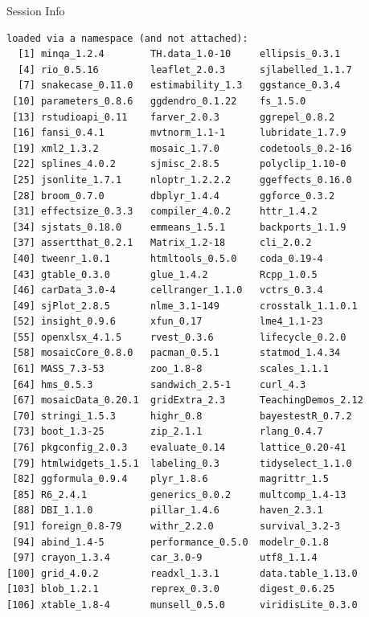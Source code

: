 \documentclass[10pt,handout]{beamer}\usepackage[]{graphicx}\usepackage[]{color}
\makeatletter
\newenvironment{kframe}{%
 \def\at@end@of@kframe{}%
 \ifinner\ifhmode%
  \def\at@end@of@kframe{\end{minipage}}%
  \begin{minipage}{\columnwidth}%
 \fi\fi%
 \def\FrameCommand##1{\hskip\@totalleftmargin \hskip-\fboxsep
 \colorbox{shadecolor}{##1}\hskip-\fboxsep
     \hskip-\linewidth \hskip-\@totalleftmargin \hskip\columnwidth}%
 \MakeFramed {\advance\hsize-\width
   \@totalleftmargin\z@ \linewidth\hsize
   \@setminipage}}%
 {\par\unskip\endMakeFramed%
 \at@end@of@kframe}
\newenvironment{knitrout}{}{} %
\makeatother
\begin{document}
\begin{frame}[fragile]{Session Info}
\begin{knitrout}
\begin{kframe}
\begin{verbatim}
loaded via a namespace (and not attached):
  [1] minqa_1.2.4        TH.data_1.0-10     ellipsis_0.3.1    
  [4] rio_0.5.16         leaflet_2.0.3      sjlabelled_1.1.7  
  [7] snakecase_0.11.0   estimability_1.3   ggstance_0.3.4    
 [10] parameters_0.8.6   ggdendro_0.1.22    fs_1.5.0          
 [13] rstudioapi_0.11    farver_2.0.3       ggrepel_0.8.2     
 [16] fansi_0.4.1        mvtnorm_1.1-1      lubridate_1.7.9   
 [19] xml2_1.3.2         mosaic_1.7.0       codetools_0.2-16  
 [22] splines_4.0.2      sjmisc_2.8.5       polyclip_1.10-0   
 [25] jsonlite_1.7.1     nloptr_1.2.2.2     ggeffects_0.16.0  
 [28] broom_0.7.0        dbplyr_1.4.4       ggforce_0.3.2     
 [31] effectsize_0.3.3   compiler_4.0.2     httr_1.4.2        
 [34] sjstats_0.18.0     emmeans_1.5.1      backports_1.1.9   
 [37] assertthat_0.2.1   Matrix_1.2-18      cli_2.0.2         
 [40] tweenr_1.0.1       htmltools_0.5.0    coda_0.19-4       
 [43] gtable_0.3.0       glue_1.4.2         Rcpp_1.0.5        
 [46] carData_3.0-4      cellranger_1.1.0   vctrs_0.3.4       
 [49] sjPlot_2.8.5       nlme_3.1-149       crosstalk_1.1.0.1 
 [52] insight_0.9.6      xfun_0.17          lme4_1.1-23       
 [55] openxlsx_4.1.5     rvest_0.3.6        lifecycle_0.2.0   
 [58] mosaicCore_0.8.0   pacman_0.5.1       statmod_1.4.34    
 [61] MASS_7.3-53        zoo_1.8-8          scales_1.1.1      
 [64] hms_0.5.3          sandwich_2.5-1     curl_4.3          
 [67] mosaicData_0.20.1  gridExtra_2.3      TeachingDemos_2.12
 [70] stringi_1.5.3      highr_0.8          bayestestR_0.7.2  
 [73] boot_1.3-25        zip_2.1.1          rlang_0.4.7       
 [76] pkgconfig_2.0.3    evaluate_0.14      lattice_0.20-41   
 [79] htmlwidgets_1.5.1  labeling_0.3       tidyselect_1.1.0  
 [82] ggformula_0.9.4    plyr_1.8.6         magrittr_1.5      
 [85] R6_2.4.1           generics_0.0.2     multcomp_1.4-13   
 [88] DBI_1.1.0          pillar_1.4.6       haven_2.3.1       
 [91] foreign_0.8-79     withr_2.2.0        survival_3.2-3    
 [94] abind_1.4-5        performance_0.5.0  modelr_0.1.8      
 [97] crayon_1.3.4       car_3.0-9          utf8_1.1.4        
[100] grid_4.0.2         readxl_1.3.1       data.table_1.13.0 
[103] blob_1.2.1         reprex_0.3.0       digest_0.6.25     
[106] xtable_1.8-4       munsell_0.5.0      viridisLite_0.3.0 
\end{verbatim}
\end{kframe}
\end{knitrout}
	
\end{frame}
\end{document}
